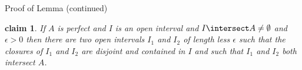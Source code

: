 \documentclass{beamer}
\newtheorem*{claim}{claim}
\begin{document}
\begin{frame}{Proof of Lemma (continued)}

\begin{claim}
If $A$ is perfect and $I$ is an open interval and $I \intersect A \neq
\emptyset$ and $\epsilon > 0$ then there are two open intervals $I_1$ and
$I_2$ of length less $\epsilon$ such that the closures of $I_1$ and
$I_2$ are disjoint and contained in $I$ and such that $I_1$ and $I_2$
both intersect $A$.
\end{claim}

\end{frame}
\end{document}

